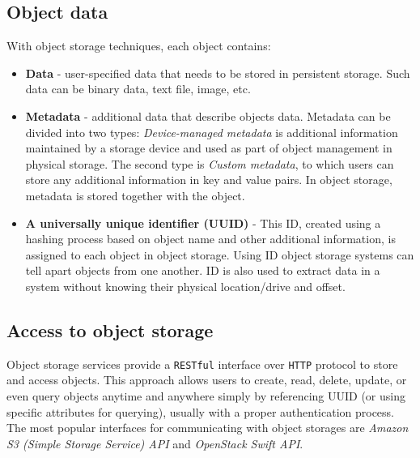     \subsection*{Object data}
    With object storage techniques, each object contains\cite{ibmObjectStorage}:
    \begin{itemize}
      \item \textbf{Data} - user-specified data that needs to be stored in persistent storage. Such data can be binary data, text file, image, etc.
      \item \textbf{Metadata} - additional data that describe objects data. Metadata can be divided into two types: \textit{Device-managed metadata} is additional information maintained by a storage device and used as part of object management in physical storage\cite{objectBasedStorage}. The second type is \textit{Custom metadata}, to which users can store any additional information in key and value pairs. In object storage, metadata is stored together with the object.
      \item \textbf{A universally unique identifier (UUID)} - This ID, created using a hashing process based on object name and other additional information, is assigned to each object in object storage. Using ID object storage systems can tell apart objects from one another. ID is also used to extract data in a system without knowing their physical location/drive and offset.
    \end{itemize}

    \subsection*{Access to object storage}
    Object storage services provide a \texttt{RESTful} interface \cite{cloudObjectStorage} over \texttt{HTTP} protocol to store and access objects. This approach allows users to create, read, delete, update, or even query objects anytime and anywhere simply by referencing UUID (or using specific attributes for querying), usually with a proper authentication process. The most popular interfaces for communicating with object storages are \textit{Amazon S3 (Simple Storage Service) API} and \textit{OpenStack Swift API}.

